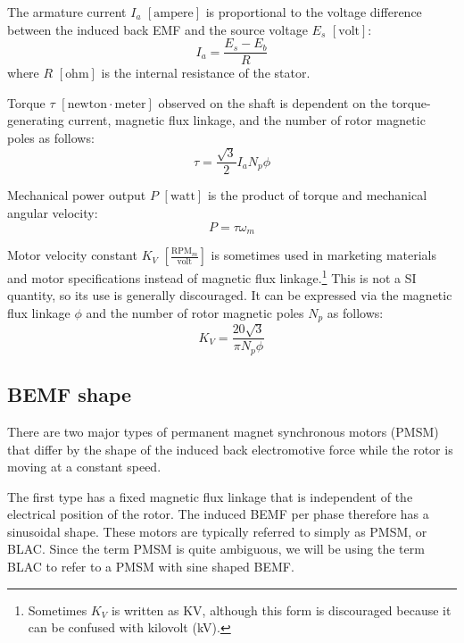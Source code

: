 \documentclass{zubaxdoc}
\begin{document}
The armature current $I_a$ $\left[\text{ampere}\right]$ is proportional to
the voltage difference between the induced back EMF and
the source voltage $E_s$ $\left[\text{volt}\right]$:
\begin{equation}
I_a = \frac{E_s - E_b}{R}
\end{equation}
where $R$ $\left[\text{ohm}\right]$ is the internal resistance of the stator.

Torque $\tau$ $\left[\text{newton}\cdot{}\text{meter}\right]$ observed on the shaft is dependent on the
torque-generating current, magnetic flux linkage, and the number of rotor magnetic poles as follows:
\begin{equation}
\tau = \frac{\sqrt{3}}{2} I_a N_p \phi
\end{equation}

Mechanical power output $P$ $\left[\text{watt}\right]$
is the product of torque and mechanical angular velocity:
\begin{equation}
P = \tau \omega_m
\end{equation}

Motor velocity constant $K_V$ $\left[\frac{\text{RPM}_m}{\text{volt}}\right]$
is sometimes used in marketing materials and motor specifications
instead of magnetic flux linkage.\footnote{Sometimes $K_V$ is written as KV, although
this form is discouraged because it can be confused with kilovolt (kV).}
This is not a SI quantity, so its use is generally discouraged.
It can be expressed via the magnetic flux linkage $\phi$
and the number of rotor magnetic poles $N_p$ as follows:
\begin{equation}
K_V = \frac{20 \sqrt{3}}{\pi  N_p \phi }
\end{equation}

\subsection{BEMF shape}

There are two major types of permanent magnet synchronous motors (PMSM) that differ by the shape of the induced
back electromotive force while the rotor is moving at a constant speed.

The first type has a fixed magnetic flux linkage that is independent of the electrical position of the rotor.
The induced BEMF per phase therefore has a sinusoidal shape.
These motors are typically referred to simply as PMSM, or BLAC.
Since the term PMSM is quite ambiguous, we will be using the term BLAC to refer to a PMSM with sine shaped BEMF.
\end{document}
